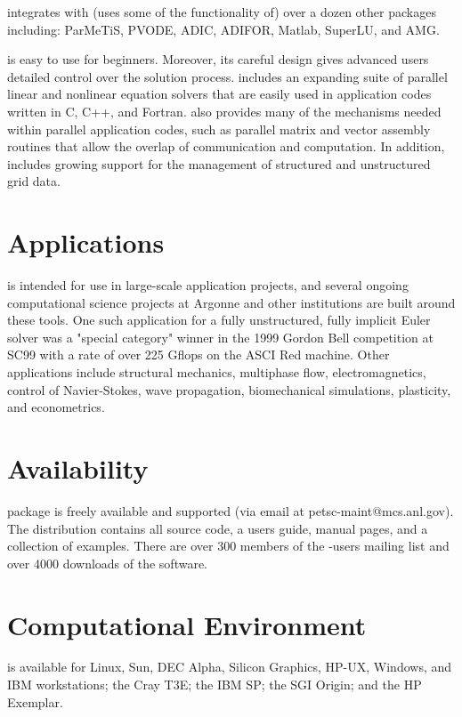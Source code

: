  integrates with (uses some of the functionality of) over a dozen other packages including: ParMeTiS, PVODE, ADIC, ADIFOR,
Matlab, SuperLU, and AMG. 
\vsp

 is easy to use for beginners.  Moreover, its careful
design gives advanced users detailed control over the
solution process.  includes an expanding suite of parallel
linear and nonlinear equation solvers that are easily used in
application codes written in C, C++, and Fortran.   also
provides many of the mechanisms needed within parallel application
codes, such as parallel matrix and vector assembly routines
that allow the overlap of communication and computation.  In addition,
 includes growing support for the management of structured and
unstructured grid data.
\vsp


\section*{Applications}
 is intended for use in large-scale application projects,
and several ongoing computational science projects at Argonne and
other institutions are built around these tools.  
One such application for a fully unstructured, fully implicit Euler
solver was a "special category" winner in the 1999 Gordon Bell
competition at SC99 with a rate of over 225 Gflops on the ASCI
Red machine. Other applications include structural mechanics, multiphase flow, electromagnetics,
control of Navier-Stokes, wave propagation, biomechanical simulations, plasticity, and econometrics.



\section*{Availability}

 package is freely available and supported (via email at petsc-maint@mcs.anl.gov).
The  distribution contains all source code, 
a users guide, manual pages, and a
collection of examples. There are over 300 members of the -users mailing list and
over 4000 downloads of the software.

\section*{Computational Environment}
 is available for Linux, Sun, DEC Alpha, Silicon Graphics, HP-UX, Windows, 
and IBM workstations; the Cray T3E; the IBM SP; the SGI Origin; and the HP Exemplar.

\vspace{-.1cm}
\makeinfo


